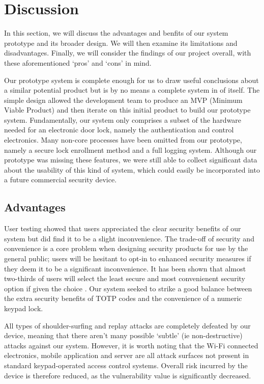 \documentclass[conference]{IEEEtran}
\begin{document}
\section{Discussion}
In this section, we will discuss the advantages and benfits of our system prototype and its broader design.
We will then examine its limitations and disadvantages.
Finally, we will consider the findings of our project overall, with these aforementioned `pros' and `cons' in mind.

Our prototype system is complete enough for us to draw useful conclusions about a similar potential product but is by no means a complete system in of itself.
The simple design allowed the development team to produce an MVP (Minimum Viable Product) and then iterate on this initial product to build our prototype system.
Fundamentally, our system only comprises a subset of the hardware needed for an electronic door lock, namely the authentication and control electronics.
Many non-core processes have been omitted from our prototype, namely a secure lock enrollment method and a full logging system.
Although our prototype was missing these features, we were still able to collect significant data about the usability of this kind of system, which could easily be incorporated into a future commercial security device.

\subsection{Advantages}
User testing showed that users appreciated the clear security benefits of our system but did find it to be a slight inconvenience.
The trade-off of security and convenience is a core problem when designing security products for use by the general public; users will be hesitant to opt-in to enhanced security measures if they deem it to be a significant inconvenience.
It has been shown that almost two-thirds of users will select the least secure and most convenienent security option if given the choice \cite{bben1}.
Our system seeked to strike a good balance between the extra security benefits of TOTP codes and the convenience of a numeric keypad lock.

All types of shoulder-surfing and replay attacks are completely defeated by our device, meaning that there aren't many possible `subtle' (ie non-destructive) attacks against our system.
However, it is worth noting that the Wi-Fi connected electronics, mobile application and server are all attack surfaces not present in standard keypad-operated access control systems.
Overall risk incurred by the device is therefore reduced, as the vulnerability value is significantly decreased.
\end{document}

